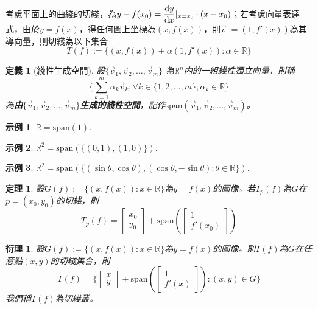 \documentclass[12pt]{article}
\newtheorem{definition}{定義}
\newtheorem*{theorem}{定理}
\newtheorem*{corollary}{衍理}
\newtheorem*{example}{示例}
\begin{document}
    考慮平面上的曲綫的切綫，為$\displaystyle y-f(x_0)=\derivative{y}{x}|_{x=x_0} \cdot (x-x_0)$；若考慮向量表達式，由於$y=f(x)$，得任何圖上坐標為$(x,f(x))$，則$\vec{v}:=(1,f'(x))$為其導向量，則切綫為以下集合$$T(f):=\{(x,f(x))+\alpha(1,f'(x)):\alpha\in\mathbb{R}\}$$

    \begin{definition}[綫性生成空間]
        設$\{\vec{v}_1, \vec{v}_2,\dots,\vec{v}_m\}$ 為$\mathbb{R}^n$内的一組綫性獨立向量，則稱$$\{\sum_{k=1}^{m}\alpha_k \vec{v}_k: \forall k \in \{1,2,\dots,m\},\alpha_k\in\mathbb{R}\}$$
        為\textbf{由$\{\vec{v}_1, \vec{v}_2,\dots,\vec{v}_m\}$生成的綫性空間}，記作$\mathrm{span}(\vec{v}_1, \vec{v}_2,\dots, \vec{v}_m)$。
    \end{definition}

    \begin{example}
        $\mathbb{R}=\mathrm{span}(1)$.
    \end{example}

    \begin{example}
        $\mathbb{R}^2=\mathrm{span}(\{(0,1),(1,0)\})$.
    \end{example}

    \begin{example}
        $\mathbb{R}^2=\mathrm{span}(\{(\sin{\theta},\cos{\theta}),(\cos{\theta},-\sin{\theta}):\theta\in\mathbb{R}\})$.
    \end{example}

    \begin{theorem}
        設$G(f):=\{(x,f(x)):x\in\mathbb{R}\}$為$y=f(x)$的圖像。若$T_p(f)$為$G$在$p=(x_0,y_0)$的切綫，則$$T_p(f)=\begin{bmatrix}
            x_0\\y_0
        \end{bmatrix}+\mathrm{span}(\begin{bmatrix}
            1\\f'(x_0)
        \end{bmatrix})$$
    \end{theorem}

    \begin{corollary}
        設$G(f):=\{(x,f(x)):x\in\mathbb{R}\}$為$y=f(x)$的圖像。則$T(f)$為$G$在任意點$(x,y)$的切綫集合，則$$T(f)=\{\begin{bmatrix}
            x\\y
        \end{bmatrix}+\mathrm{span}(\begin{bmatrix}
            1\\f'(x)
        \end{bmatrix}): (x,y)\in G\}$$
        我們稱$T(f)$為切綫叢。
    \end{corollary}
\end{document}
